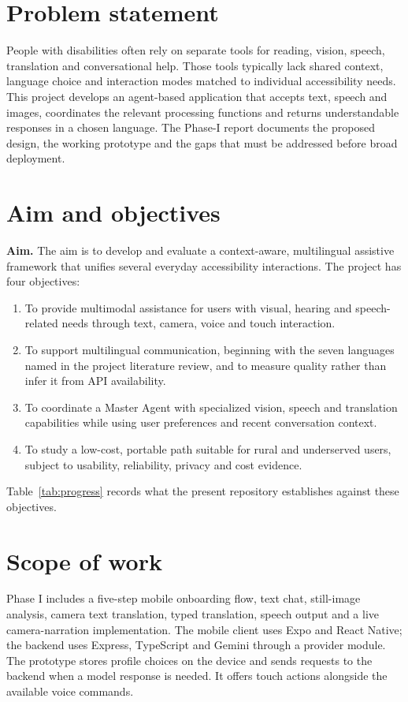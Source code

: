 \documentclass[12pt,a4paper,oneside]{report}
\begin{document}
\section{Problem statement}
People with disabilities often rely on separate tools for reading, vision, speech, translation and conversational help. Those tools typically lack shared context, language choice and interaction modes matched to individual accessibility needs. This project develops an agent-based application that accepts text, speech and images, coordinates the relevant processing functions and returns understandable responses in a chosen language. The Phase-I report documents the proposed design, the working prototype and the gaps that must be addressed before broad deployment.

\section{Aim and objectives}
\textbf{Aim.} The aim is to develop and evaluate a context-aware, multilingual assistive framework that unifies several everyday accessibility interactions. The project has four objectives:
\begin{enumerate}[leftmargin=*]
\item To provide multimodal assistance for users with visual, hearing and speech-related needs through text, camera, voice and touch interaction.
\item To support multilingual communication, beginning with the seven languages named in the project literature review, and to measure quality rather than infer it from API availability.
\item To coordinate a Master Agent with specialized vision, speech and translation capabilities while using user preferences and recent conversation context.
\item To study a low-cost, portable path suitable for rural and underserved users, subject to usability, reliability, privacy and cost evidence.
\end{enumerate}
Table~\ref{tab:progress} records what the present repository establishes against these objectives.

\section{Scope of work}
Phase I includes a five-step mobile onboarding flow, text chat, still-image analysis, camera text translation, typed translation, speech output and a live camera-narration implementation. The mobile client uses Expo and React Native; the backend uses Express, TypeScript and Gemini through a provider module. The prototype stores profile choices on the device and sends requests to the backend when a model response is needed. It offers touch actions alongside the available voice commands.
\end{document}
